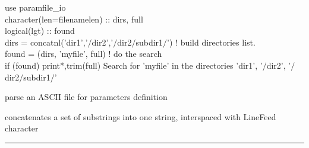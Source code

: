 \begin{example}
{
use paramfile\_io \\
character(len=filenamelen) :: dirs, full \\
logical(lgt) :: found \\
dirs = concatnl('dir1','$/$dir2','$/$dir2$/$subdir1$/$') ! build directories list. \\
found = \thedocid(dirs, 'myfile', full) ! do the search \\
if (found) print*,trim(full)
}
{{Search for 'myfile' in the directories  'dir1', '$/$dir2', '$/$dir2$/$subdir1$/$'}}
\end{example}

\begin{related}
  \begin{sulist}{} %
  \item[\htmlref{parse\_xxx}{sub:parse_xxx}] parse an ASCII file for parameters definition
  \item[\htmlref{concatnl}{sub:concatnl}] concatenates a set of substrings into one string, interspaced
  with LineFeed character
  \end{sulist}
\end{related}

\rule{\hsize}{2mm}

